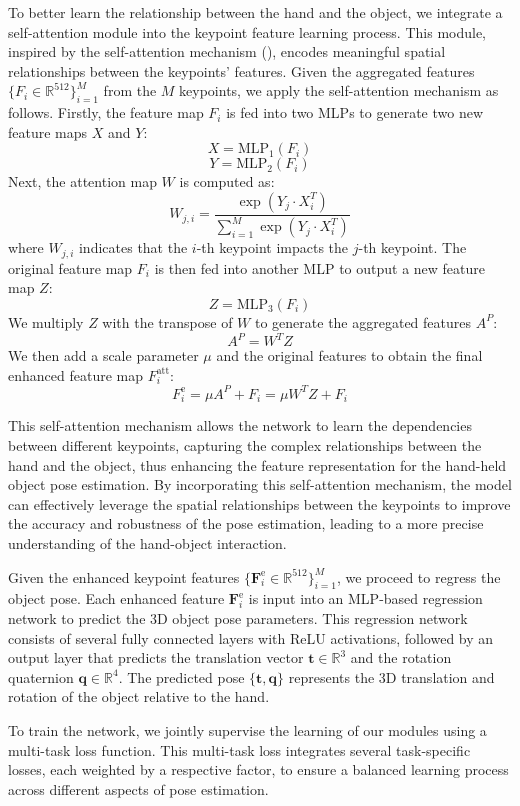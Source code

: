 To better learn the relationship between the hand and the object, we integrate a self-attention module into the keypoint feature learning process. This module, inspired by the self-attention mechanism (\cite{zhang2019self}), encodes meaningful spatial relationships between the keypoints' features. Given the aggregated features $\{F_i \in \mathbb{R}^{512}\}_{i=1}^M$ from the $M$ keypoints, we apply the self-attention mechanism as follows. Firstly, the feature map $F_i$ is fed into two MLPs to generate two new feature maps $X$ and $Y$:
\[
X = \text{MLP}_1(F_i)
\]
\[
Y = \text{MLP}_2(F_i)
\]
Next, the attention map $W$ is computed as:
\[
W_{j,i} = \frac{\exp(Y_j \cdot X_i^T)}{\sum_{i=1}^{M} \exp(Y_j \cdot X_i^T)}
\]
where $W_{j,i}$ indicates that the $i$-th keypoint impacts the $j$-th keypoint. The original feature map $F_i$ is then fed into another MLP to output a new feature map $Z$:
\[
Z = \text{MLP}_3(F_i)
\]
We multiply $Z$ with the transpose of $W$ to generate the aggregated features $A^P$:
\[
A^P = W^T Z
\]
We then add a scale parameter $\mu$ and the original features to obtain the final enhanced feature map $F_i^{\text{att}}$:
\[
F_i^{\text{e}} = \mu A^P + F_i = \mu W^T Z + F_i
\]

This self-attention mechanism allows the network to learn the dependencies between different keypoints, capturing the complex relationships between the hand and the object, thus enhancing the feature representation for the hand-held object pose estimation. By incorporating this self-attention mechanism, the model can effectively leverage the spatial relationships between the keypoints to improve the accuracy and robustness of the pose estimation, leading to a more precise understanding of the hand-object interaction.

Given the enhanced keypoint features $\{\mathbf{F}_i^{\text{e}} \in \mathbb{R}^{512}\}_{i=1}^M$, we proceed to regress the object pose. Each enhanced feature $\mathbf{F}_i^{\text{e}}$ is input into an MLP-based regression network to predict the 3D object pose parameters. This regression network consists of several fully connected layers with ReLU activations, followed by an output layer that predicts the translation vector $\mathbf{t} \in \mathbb{R}^{3}$ and the rotation quaternion $\mathbf{q} \in \mathbb{R}^{4}$. The predicted pose $\{\mathbf{t}, \mathbf{q}\}$ represents the 3D translation and rotation of the object relative to the hand.

To train the network, we jointly supervise the learning of our modules using a multi-task loss function. This multi-task loss integrates several task-specific losses, each weighted by a respective factor, to ensure a balanced learning process across different aspects of pose estimation.

